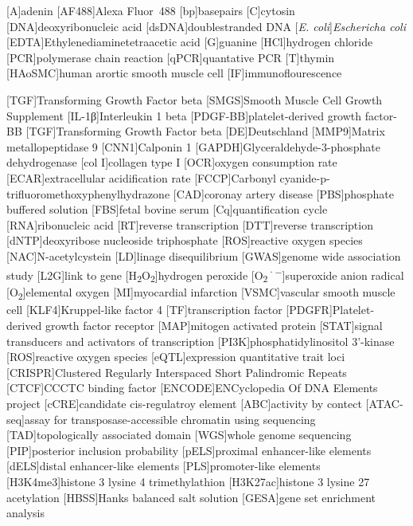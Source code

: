 \begin{acronym}
[A]{adenin}
[AF488]{Alexa Fluor\textsuperscript{\textregistered}~488}
[bp]{basepairs}
[C]{cytosin}
[DNA]{deoxyribonucleic acid}
[dsDNA]{doublestranded DNA}
[\textit{E. coli}]{\textit{Eschericha coli}}
[EDTA]{Ethylenediaminetetraacetic acid}
[G]{guanine}
[HCl]{hydrogen chloride}
[PCR]{polymerase chain reaction}
[qPCR]{quantative PCR}
[T]{thymin}
[HAoSMC]{human arortic smooth muscle cell}
[IF]{immunoflourescence}


[TGF\beta]{Transforming Growth Factor beta}
[SMGS]{Smooth Muscle Cell Growth Supplement}
[IL-1β]{Interleukin 1 beta}
[PDGF-BB]{platelet-derived growth factor-BB}
[TGF\beta]{Transforming Growth Factor beta}
[DE]{Deutschland}
[MMP9]{Matrix metallopeptidase 9}
[CNN1]{Calponin 1}
[GAPDH]{Glyceraldehyde-3-phosphate dehydrogenase}
[col I]{collagen type I}
[OCR]{oxygen consumption rate}
[ECAR]{extracellular acidification rate}
[FCCP]{Carbonyl cyanide-p-trifluoromethoxyphenylhydrazone}
[CAD]{coronay artery disease}
[PBS]{phosphate buffered solution}
[FBS]{fetal bovine serum}
[Cq]{quantification cycle}
[RNA]{ribonucleic acid}
[RT]{reverse transcription}
[DTT]{reverse transcription}
[dNTP]{deoxyribose nucleoside triphosphate}
[ROS]{reactive oxygen species}
[NAC]{N-acetylcystein}
[LD]{linage disequilibrium}
[GWAS]{genome wide association study}
[L2G]{link to gene}
[H\textsubscript{2}O\textsubscript{2}]{hydrogen peroxide}
[O\textsubscript{2}\textsuperscript{·−}]{superoxide anion radical}
[O\textsubscript{2}]{elemental oxygen}
[MI]{myocardial infarction}
[VSMC]{vascular smooth muscle cell}
[KLF4]{Kruppel-like factor 4}
[TF]{transcription factor}
[PDGFR]{Platelet-derived growth factor receptor}
[MAP]{mitogen activated protein}
[STAT]{signal transducers and activators of transcription}
[PI3K]{phosphatidylinositol 3'-kinase}
[ROS]{reactive oxygen species}
[eQTL]{expression quantitative trait loci}
[CRISPR]{Clustered Regularly Interspaced Short Palindromic Repeats}
[CTCF]{CCCTC binding factor}
[ENCODE]{ENCyclopedia Of DNA Elements project}
[cCRE]{candidate cis-regulatroy element}
[ABC]{activity by contect}
[ATAC-seq]{assay for transposase-accessible chromatin using sequencing}
[TAD]{topologically associated domain}
[WGS]{whole genome sequencing}
[PIP]{posterior inclusion probability}
[pELS]{proximal enhancer-like elements}
[dELS]{distal enhancer-like elements}
[PLS]{promoter-like elements}
[H3K4me3]{histone 3 lysine 4 trimethylathion}
[H3K27ac]{histone 3 lysine 27 acetylation}
[HBSS]{Hanks balanced salt solution}
[GESA]{gene set enrichment analysis}


\end{acronym}
